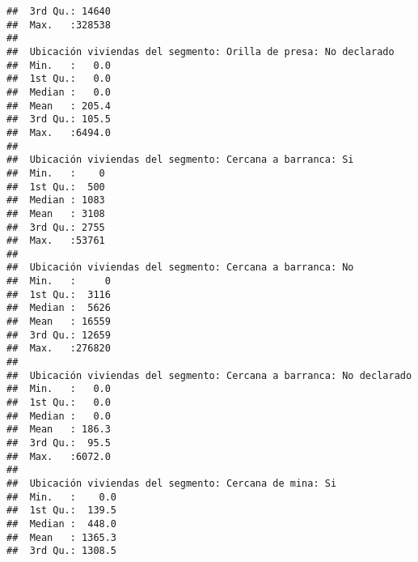 \documentclass[11pt,]{article}
\begin{document}
\begin{verbatim}
##  3rd Qu.: 14640                                       
##  Max.   :328538                                       
##                                                       
##  Ubicación viviendas del segmento: Orilla de presa: No declarado
##  Min.   :   0.0                                                 
##  1st Qu.:   0.0                                                 
##  Median :   0.0                                                 
##  Mean   : 205.4                                                 
##  3rd Qu.: 105.5                                                 
##  Max.   :6494.0                                                 
##                                                                 
##  Ubicación viviendas del segmento: Cercana a barranca: Si
##  Min.   :    0                                           
##  1st Qu.:  500                                           
##  Median : 1083                                           
##  Mean   : 3108                                           
##  3rd Qu.: 2755                                           
##  Max.   :53761                                           
##                                                          
##  Ubicación viviendas del segmento: Cercana a barranca: No
##  Min.   :     0                                          
##  1st Qu.:  3116                                          
##  Median :  5626                                          
##  Mean   : 16559                                          
##  3rd Qu.: 12659                                          
##  Max.   :276820                                          
##                                                          
##  Ubicación viviendas del segmento: Cercana a barranca: No declarado
##  Min.   :   0.0                                                    
##  1st Qu.:   0.0                                                    
##  Median :   0.0                                                    
##  Mean   : 186.3                                                    
##  3rd Qu.:  95.5                                                    
##  Max.   :6072.0                                                    
##                                                                    
##  Ubicación viviendas del segmento: Cercana de mina: Si
##  Min.   :    0.0                                      
##  1st Qu.:  139.5                                      
##  Median :  448.0                                      
##  Mean   : 1365.3                                      
##  3rd Qu.: 1308.5                                      

\end{verbatim}
\end{document}
